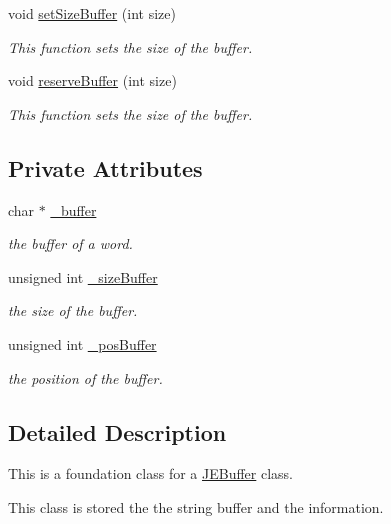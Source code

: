 \begin{CompactItemize}
void \hyperlink{classkmaOrange_1_1Buffer_0d7ee52c85477ab147f8cc741cfcac50}{setSizeBuffer} (int size)
\begin{CompactList}\small\item\em This function sets the size of the buffer. \item\end{CompactList}\item 
void \hyperlink{classkmaOrange_1_1Buffer_4afbe5aa986d4f15d9ae93358a716e62}{reserveBuffer} (int size)
\begin{CompactList}\small\item\em This function sets the size of the buffer. \item\end{CompactList}\end{CompactItemize}
\subsection*{Private Attributes}
\begin{CompactItemize}
\item 
char $\ast$ \hyperlink{classkmaOrange_1_1Buffer_ba8240e4cf81f0878217f8350ca3dae6}{\_\-buffer}
\begin{CompactList}\small\item\em the buffer of a word. \item\end{CompactList}\item 
unsigned int \hyperlink{classkmaOrange_1_1Buffer_9802c22c40425c9588b33a59cc9f7636}{\_\-sizeBuffer}
\begin{CompactList}\small\item\em the size of the buffer. \item\end{CompactList}\item 
unsigned int \hyperlink{classkmaOrange_1_1Buffer_f4bb54f6fd24ec09040b1e7f54ee3167}{\_\-posBuffer}
\begin{CompactList}\small\item\em the position of the buffer. \item\end{CompactList}\end{CompactItemize}


\subsection{Detailed Description}
This is a foundation class for a \hyperlink{classkmaOrange_1_1JEBuffer}{JEBuffer} class.\par
 This class is stored the the string buffer and the information. 

